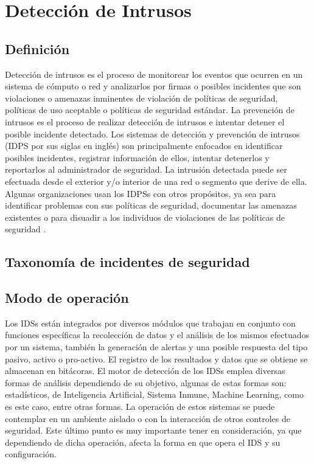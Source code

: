 \section{Detección de Intrusos}

\subsection{Definición}

Detección de intrusos es el proceso de monitorear los eventos que ocurren en un sistema de cómputo o red y analizarlos por firmas o posibles incidentes que son violaciones o amenazas inminentes de violación de políticas de seguridad, políticas de uso aceptable o políticas de seguridad estándar. La prevención de intrusos es el proceso de realizar detección de intrusos e intentar detener el posible incidente detectado. Los sistemas de detección y prevención de intrusos (IDPS por sus siglas en inglés) son principalmente enfocados en identificar posibles incidentes, registrar información de ellos, intentar detenerlos y reportarlos al administrador de seguridad. La intrusión detectada puede ser efectuada desde el exterior y/o interior de una red o segmento que derive de ella. Algunas organizaciones usan los IDPSs con otros propósitos, ya sea para identificar problemas con sus políticas de seguridad, documentar las amenazas existentes o para disuadir a los individuos de violaciones de las políticas de seguridad \cite{nist94}. \\

\subsection{Taxonomía de incidentes de seguridad}

\subsection{Modo de operación}

Los IDSs están integrados por diversos módulos que trabajan en conjunto con funciones específicas la recolección de datos y el análisis de los mismos efectuados por un sistema, también la generación de alertas y una posible respuesta del tipo pasivo, activo o pro-activo. El registro de los resultados y datos que se obtiene se almacenan en bitácoras. El motor de detección de los IDSs emplea diversas formas de análisis dependiendo de su objetivo, algunas de estas formas son: estadísticos, de Inteligencia Artificial, Sistema Inmune, Machine Learning, como es este caso, entre otras formas. La operación de estos sistemas se puede contemplar en un ambiente aislado o con la interacción de otros controles de seguridad. Este último punto es muy importante tener en consideración, ya que dependiendo de dicha operación, afecta la forma en que opera el IDS y su configuración. \\

